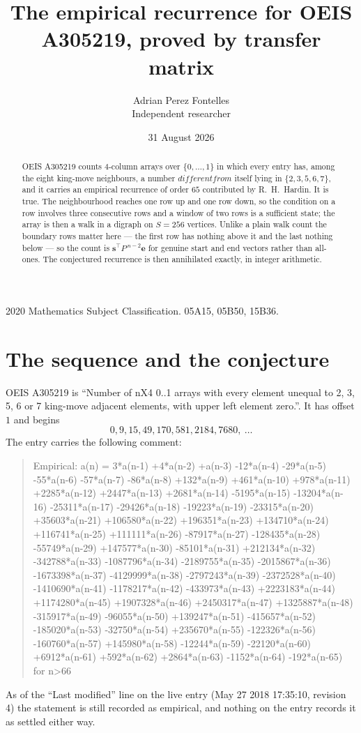 \documentclass[11pt,a4paper]{article}
\title{The empirical recurrence for OEIS A305219, proved by transfer matrix}
\author{Adrian Perez Fontelles\\ \small Independent researcher}
\date{31 August 2026}
\theoremstyle{plain}
\theoremstyle{definition}
\begin{document}
\maketitle

\begin{abstract}
OEIS A305219 counts $4$-column arrays over $\{0,\dots,1\}$ in which every entry has,
among the eight king-move neighbours, a number $different from$ itself lying in $\{2,3,5,6,7\}$, and it carries an empirical
recurrence of order $65$ contributed by R.~H.~Hardin. It is true. The neighbourhood
reaches one row up and one row down, so the condition on a row involves three consecutive
rows and a window of two rows is a sufficient state; the array is then a walk in a digraph
on $S=256$ vertices. Unlike a plain walk count the boundary rows matter here --- the first
row has nothing above it and the last nothing below --- so the count is
$\mathbf{s}^{\!\top}P^{\,n-2}\mathbf{e}$ for genuine start and end vectors rather than
all-ones. The conjectured recurrence is then annihilated exactly, in integer arithmetic.
\end{abstract}

\noindent\small 2020 Mathematics Subject Classification. 05A15, 05B50, 15B36.\normalsize

\section{The sequence and the conjecture}

OEIS A305219 is ``Number of nX4 0..1 arrays with every element unequal to 2, 3, 5, 6 or 7 king-move adjacent elements, with upper left element zero.''. It has offset
$1$ and begins
\[
0, 9, 15, 49, 170, 581, 2184, 7680,\ \dots
\]
The entry carries the following comment:
\begin{quote}\small
Empirical: a(n) = 3*a(n-1) +4*a(n-2) +a(n-3) -12*a(n-4) -29*a(n-5) -55*a(n-6) -57*a(n-7) -86*a(n-8) +132*a(n-9) +461*a(n-10) +978*a(n-11) +2285*a(n-12) +2447*a(n-13) +2681*a(n-14) -5195*a(n-15) -13204*a(n-16) -25311*a(n-17) -29426*a(n-18) -19223*a(n-19) -23315*a(n-20) +35603*a(n-21) +106580*a(n-22) +196351*a(n-23) +134710*a(n-24) +116741*a(n-25) +111111*a(n-26) -87917*a(n-27) -128435*a(n-28) -55749*a(n-29) +147577*a(n-30) -85101*a(n-31) +212134*a(n-32) -342788*a(n-33) -1087796*a(n-34) -2189755*a(n-35) -2015867*a(n-36) -1673398*a(n-37) -4129999*a(n-38) -2797243*a(n-39) -2372528*a(n-40) -1410690*a(n-41) -1178217*a(n-42) -433973*a(n-43) +2223183*a(n-44) +1174280*a(n-45) +1907328*a(n-46) +2450317*a(n-47) +1325887*a(n-48) -315917*a(n-49) -96055*a(n-50) +139247*a(n-51) -415657*a(n-52) -185020*a(n-53) -32750*a(n-54) +235670*a(n-55) -122326*a(n-56) -160760*a(n-57) +145980*a(n-58) -12244*a(n-59) -22120*a(n-60) +6912*a(n-61) +592*a(n-62) +2864*a(n-63) -1152*a(n-64) -192*a(n-65) for n>66
\end{quote}
As of the ``Last modified'' line on the live entry (May 27 2018 17:35:10, revision
4) the statement is still recorded as empirical, and nothing on the entry
records it as settled either way.
\end{document}
